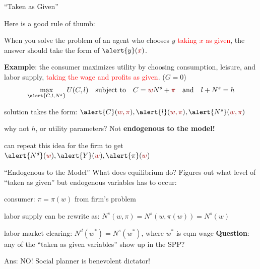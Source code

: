 \documentclass[11pt,aspectratio=169,usenames,dvipsnames]{beamer}
\newcommand{\red}[1]{\textcolor{red}{#1}}
\let\tempone\itemize
\let\temptwo\enditemize
\renewenvironment{itemize}{\tempone\addtolength{\itemsep}{\fill}}{\temptwo}
\begin{document}
\begin{frame}{``Taken as Given''}
\label{slide:__Taken_as_Given}

Here is a good rule of thumb:
\begin{center}
    When you solve the problem of an agent who \alert{chooses $ y $} \red{taking $ x $ as given}, the answer should take the form of $ \alert{y}( \red{x} ) $.
\end{center}
\textbf{Example}: the consumer maximizes utility by \alert{choosing consumption, leisure, and labor supply}, \red{taking the wage and profits as given}. ($G = 0$)
%
\begin{equation}
\label{eq:taken_as_given}
    \max_{\alert{C, l, N^{s}}} U( C, l ) \quad \text{subject to} \quad C = \red{w} N^{s} + \red{\pi} \quad \text{and} \quad l + N^{s} = h
\end{equation}
%
\begin{itemize}
    \item solution takes the form: $ \alert{C}( \red{w, \pi} ), \alert{l}( \red{w, \pi} ), \alert{N^{s}}( \red{w, \pi} )$
    \item why not $ h $, or utility parameters? Not \textbf{endogenous to the model!}
    \item can repeat this idea for the firm to get $ \alert{N^{d}}( \red{w} ), \alert{Y}( \red{w} ), \alert{\pi}( \red{w} )$
\end{itemize}
\end{frame}

\begin{frame}{``Endogenous to the Model''}
\label{slide:__Endogenous_to_the_Model__}
    What does equilibrium do? Figures out what level of ``taken as given'' but endogenous variables has to occur:
    \begin{itemize}
        \item consumer: $ \pi = \pi( w ) $ from firm's problem
        \item labor supply can be rewrite as: $ N^{s} ( w, \pi ) = N^{s}( w, \pi( w ) ) = N^{s}( w )$
        \item labor market clearing: $ N^{d}( w^{*} ) = N^{s}( w^{*} ) $, where $ w^{*} $ is eqm wage
    \end{itemize}
    \textbf{Question}: any of the ``taken as given variables'' show up in the SPP?
    \begin{itemize}
        \item Ans: NO! Social planner is \alert{benevolent dictator}!
    \end{itemize}
\end{frame}
\end{document}
